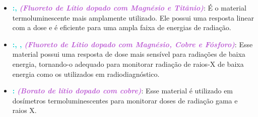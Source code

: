 \documentclass[11pt,a4paper]{article}
\begin{document}
	\begin{tcolorbox}[width=\textwidth, colback={white}, colbacktitle={DarkTurquoise!50!white}, title={$\bigstar$ \LobsterTwo{Materiais TLD} $\bigstar$}, coltitle={CarnationPink}, colframe={DarkTurquoise}, fonttitle=\rmfamily\bfseries\Large, breakable]
		\begin{itemize}[label=\textcolor{CarnationPink}{$\star$}]
			\item \textcolor{DarkTurquoise}{\textbf{:, }} \textcolor{MediumOrchid}{\textit{\textbf{(Fluoreto de Lítio dopado com Magnésio e Titânio)}}}: É o material termoluminescente mais amplamente utilizado. Ele possui uma resposta linear com a dose e é eficiente para uma ampla faixa de energias de radiação.
			
			\item \textcolor{DarkTurquoise}{\textbf{:, , }} \textcolor{MediumOrchid}{\textit{\textbf{(Fluoreto de Lítio dopado com Magnésio, Cobre e Fósforo)}}}: Esse material possui uma resposta de dose mais sensível para radiações de baixa energia, tornando-o adequado para monitorar radiação de raios-X de baixa energia como os utilizados em radiodiagnóstico.
			
			\item \textcolor{DarkTurquoise}{\textbf{:}} \textcolor{MediumOrchid}{\textit{\textbf{(Borato de lítio dopado com cobre)}}}: Esse material é utilizado em dosímetros termoluminescentes para monitorar doses de radiação gama e raios X.
			

\end{itemize}
\end{tcolorbox}
\end{document}
